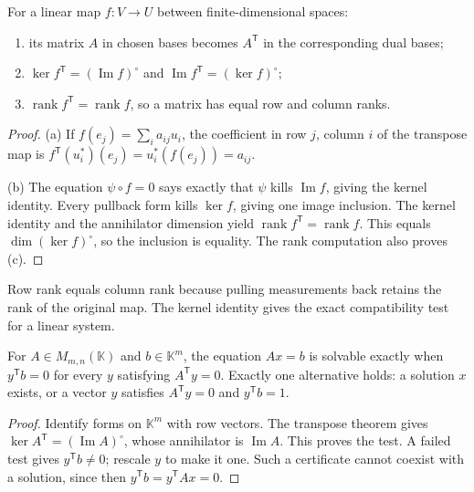 \begin{theorem}\label{linear:thm:transpose}
For a linear map $f:V\to U$ between finite-dimensional spaces:
\begin{enumerate}[label=(\alph*)]
\item its matrix $A$ in chosen bases becomes $A^{\mathsf T}$ in the corresponding dual bases;
\item $\ker f^{\mathsf T}=(\operatorname{Im}f)^\circ$ and $\operatorname{Im}f^{\mathsf T}=(\ker f)^\circ$;
\item $\operatorname{rank}f^{\mathsf T}=\operatorname{rank}f$, so a matrix has equal row and column ranks.
\end{enumerate}
\end{theorem}
\begin{proof}
(a) If $f(e_j)=\sum_i a_{ij}u_i$, the coefficient in row $j$, column $i$ of the transpose map is $f^{\mathsf T}(u_i^*)(e_j)=u_i^*(f(e_j))=a_{ij}$.

(b) The equation $\psi\circ f=0$ says exactly that $\psi$ kills $\operatorname{Im}f$, giving the kernel identity. Every pullback form kills $\ker f$, giving one image inclusion. The kernel identity and the annihilator dimension yield $\operatorname{rank}f^{\mathsf T}=\operatorname{rank}f$. This equals $\dim(\ker f)^\circ$, so the inclusion is equality. The rank computation also proves (c).
\end{proof}

Row rank equals column rank because pulling measurements back retains the rank of the original map. The kernel identity gives the exact compatibility test for a linear system.

\begin{corollary}\label{linear:cor:fredholm}
For $A\in M_{m,n}(\mathbb K)$ and $b\in\mathbb K^m$, the equation $Ax=b$ is solvable exactly when $y^{\mathsf T}b=0$ for every $y$ satisfying $A^{\mathsf T}y=0$. Exactly one alternative holds: a solution $x$ exists, or a vector $y$ satisfies $A^{\mathsf T}y=0$ and $y^{\mathsf T}b=1$.
\end{corollary}
\begin{proof}
Identify forms on $\mathbb K^m$ with row vectors. The transpose theorem gives $\ker A^{\mathsf T}=(\operatorname{Im}A)^\circ$, whose annihilator is $\operatorname{Im}A$. This proves the test. A failed test gives $y^{\mathsf T}b\ne0$; rescale $y$ to make it one. Such a certificate cannot coexist with a solution, since then $y^{\mathsf T}b=y^{\mathsf T}Ax=0$.
\end{proof}

